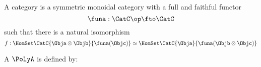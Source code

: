 \begin{definition}
    \label{def:star-autonomous-categor-2y}
    A \starautonomous category is a symmetric monoidal category
    with a full and faithful functor
    \begin{equation}
        \funa: \CatC\op \fto \CatC
    \end{equation}
    such that there is a natural isomorphism
    \begin{equation}
        f : \HomSet\CatC{\Obja \otimes \Objb}{\funa(\Objc)} \simeq \HomSet\CatC{\Obja}{\funa(\Objb \otimes \Objc)}
    \end{equation}
\end{definition}

\begin{ctdefinition}[Polycategory]
    \label{def:multicategory}
    A  $\PolyA$ is defined by:


\end{ctdefinition}
